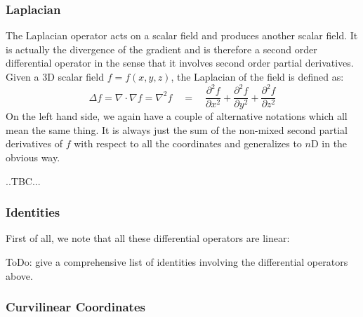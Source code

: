 \subsubsection{Laplacian}
The Laplacian operator acts on a scalar field and produces another scalar field. It is actually the divergence of the gradient and is therefore a second order differential operator in the sense that it involves second order partial derivatives. Given a 3D scalar field $f = f(x,y,z)$, the Laplacian of the field is defined as:
\begin{equation}
 \Delta f = \nabla \cdot \nabla f = \nabla^2 f \quad = \quad
 \frac{\partial^2 f}{\partial x^2} + 
 \frac{\partial^2 f}{\partial y^2} + 
 \frac{\partial^2 f}{\partial z^2}   
\end{equation}
On the left hand side, we again have a couple of alternative notations which all mean the same thing. It is always just the sum of the non-mixed second partial derivatives of $f$ with respect to all the coordinates and generalizes to $n$D in the obvious way.

..TBC...


\subsubsection{Identities}
First of all, we note that all these differential operators are linear:

ToDo: give a comprehensive list of identities involving the differential operators above.





\subsubsection{Curvilinear Coordinates}

